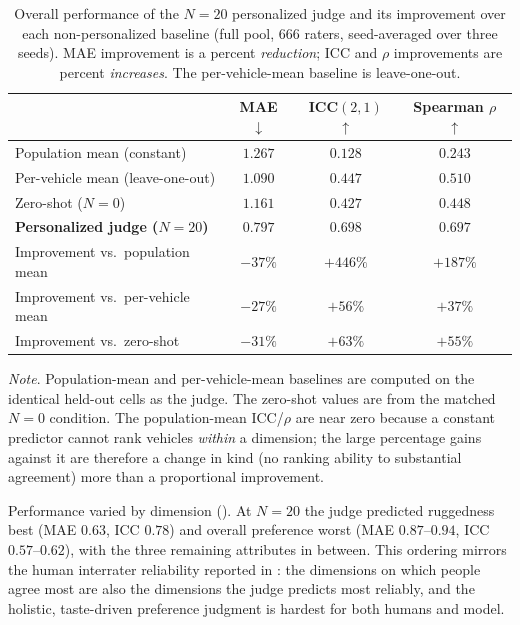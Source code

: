 \begin{table}[htbp]
\centering
\caption{Overall performance of the $N{=}20$ personalized judge and its
improvement over each non-personalized baseline (full pool, $666$ raters,
seed-averaged over three seeds). MAE improvement is a percent \emph{reduction};
ICC and $\rho$ improvements are percent \emph{increases}. The per-vehicle-mean
baseline is leave-one-out.}
\label{tab:ctx20-improvement}
\begin{tabular}{lccc}
\hline
 & MAE $\downarrow$ & ICC$(2,1)$ $\uparrow$ & Spearman $\rho$ $\uparrow$ \\
\hline
Population mean (constant)      & $1.267$ & $0.128$ & $0.243$ \\
Per-vehicle mean (leave-one-out)& $1.090$ & $0.447$ & $0.510$ \\
Zero-shot ($N{=}0$)             & $1.161$ & $0.427$ & $0.448$ \\
\textbf{Personalized judge ($N{=}20$)} & $\mathbf{0.797}$ & $\mathbf{0.698}$ & $\mathbf{0.697}$ \\
\hline
Improvement vs.\ population mean & $-37\%$ & $+446\%$ & $+187\%$ \\
Improvement vs.\ per-vehicle mean& $-27\%$ & $+56\%$  & $+37\%$  \\
Improvement vs.\ zero-shot       & $-31\%$ & $+63\%$  & $+55\%$  \\
\hline
\end{tabular}
\vspace{0.4em}
\begin{minipage}{\linewidth}
\footnotesize
\textit{Note}. Population-mean and per-vehicle-mean baselines are computed on the
identical held-out cells as the judge. The zero-shot values are from the matched
$N{=}0$ condition. The population-mean ICC/$\rho$ are near zero because a constant
predictor cannot rank vehicles \emph{within} a dimension; the large percentage
gains against it are therefore a change in kind (no ranking ability to substantial
agreement) more than a proportional improvement.
\end{minipage}
\end{table}

Performance varied by dimension ().
At $N{=}20$ the judge predicted ruggedness best (MAE $0.63$, ICC $0.78$) and overall
preference worst (MAE $0.87$--$0.94$, ICC $0.57$--$0.62$), with the three remaining
attributes in between. This ordering mirrors the human interrater reliability
reported in : the dimensions on which people agree most
are also the dimensions the judge predicts most reliably, and the holistic,
taste-driven preference judgment is hardest for both humans and model.

